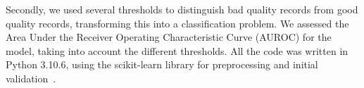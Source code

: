 Secondly, we used several thresholds to distinguish bad quality records from good quality records, transforming this into a classification problem. We assessed the Area Under the Receiver Operating Characteristic Curve (AUROC) for the model, taking into account the different thresholds. All the code was written in Python 3.10.6, using the scikit-learn library for preprocessing and initial validation~\cite{scikit-learn}.
